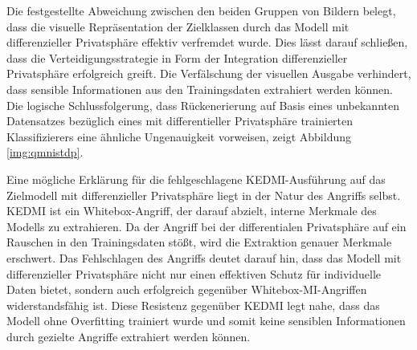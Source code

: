 Die festgestellte Abweichung zwischen den beiden Gruppen von Bildern belegt, dass die visuelle Repräsentation der Zielklassen durch das Modell mit differenzieller Privatsphäre effektiv verfremdet wurde. Dies lässt darauf schließen, dass die Verteidigungsstrategie in Form der Integration differenzieller Privatsphäre erfolgreich greift. Die Verfälschung der visuellen Ausgabe verhindert, dass sensible Informationen aus den Trainingsdaten extrahiert werden können. Die logische Schlussfolgerung, dass Rückenerierung auf Basis eines \glqq unbekannten Datensatzes\grqq{} bezüglich eines mit differentieller Privatsphäre trainierten Klassifizierers eine ähnliche Ungenauigkeit vorweisen, zeigt Abbildung \ref{img:qmnistdp}.

Eine mögliche Erklärung für die fehlgeschlagene KEDMI-Ausführung auf das Zielmodell mit differenzieller Privatsphäre liegt in der Natur des Angriffs selbst. KEDMI ist ein Whitebox-Angriff, der darauf abzielt, interne Merkmale des Modells zu extrahieren. Da der Angriff bei der differentialen Privatsphäre auf ein Rauschen in den Trainingsdaten stößt, wird die Extraktion genauer Merkmale erschwert. Das Fehlschlagen des Angriffs deutet darauf hin, dass das Modell mit differenzieller Privatsphäre nicht nur einen effektiven Schutz für individuelle Daten bietet, sondern auch erfolgreich gegenüber Whitebox-MI-Angriffen widerstandsfähig ist. Diese Resistenz gegenüber KEDMI legt nahe, dass das Modell ohne Overfitting trainiert wurde und somit keine sensiblen Informationen durch gezielte Angriffe extrahiert werden können.

